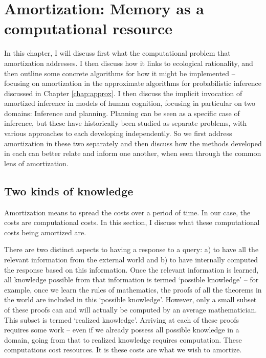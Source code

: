 \chapter{Amortization: Memory as a computational resource}
\label{chap:amort}

In this chapter, I will discuss first what the computational problem that amortization addresses. I then discuss how it links to ecological rationality, and then outline some concrete algorithms for how it might be implemented -- focusing on amortization in the approximate algorithms for probabilistic inference discussed in Chapter \ref{chap:approx}. I then discuss the implicit invocation of amortized inference in models of human cognition, focusing in particular on two domains: Inference and planning. Planning can be seen as a specific case of inference\citep{botvinick2012planning}, but these have historically been studied as separate problems, with various approaches to each developing independently. So we first address amortization in these two separately and then discuss how the methods developed in each can better relate and inform one another, when seen through the common lens of amortization.

\section{Two kinds of knowledge}

Amortization means to spread the costs over a period of time. In our case, the costs are computational costs. In this section, I discuss what these computational costs being amortized are. 

There are two distinct aspects to having a response to a query: a) to have all the relevant information from the external world and b) to have internally computed the response based on this information. Once the relevant information is learned, all knowledge possible from that information is termed `possible knowledge' -- for example, once we learn the rules of mathematics, the proofs of all the theorems in the world are included in this `possible knowledge'. However, only a small subset of these proofs can and will actually be computed by an average mathematician. This subset is termed `realized knowledge'. Arriving at each of these proofs requires some work -- even if we already possess all possible knowledge in a domain, going from that to realized knowledge requires computation. These computations cost resources. It is these costs are what we wish to amortize.

